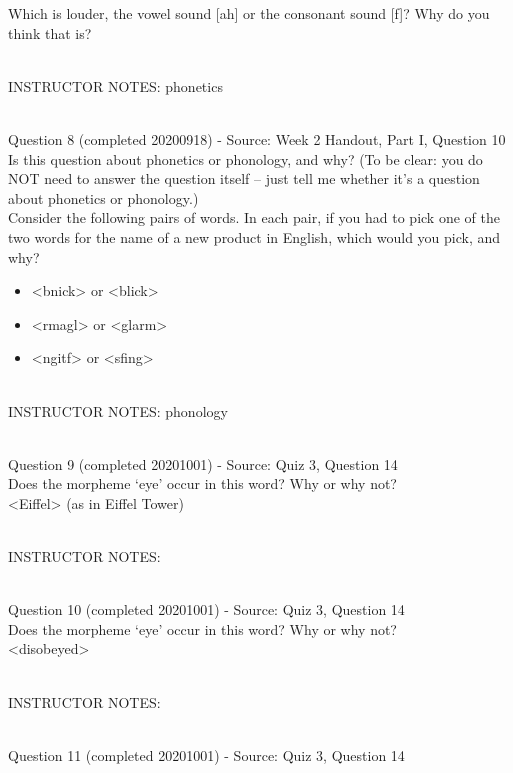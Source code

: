 \documentclass[12pt]{article}
\begin{document}
Which is louder, the vowel sound {[ah]} or the consonant sound {[f]}? Why do you think that is?


~\\
INSTRUCTOR NOTES: phonetics


~\\

{\large Question 8} (completed 20200918) - Source: Week 2 Handout, Part I, Question 10\\

Is this question about phonetics or phonology, and why? (To be clear: you do NOT need to answer the question itself -- just tell me whether it's a question about phonetics or phonology.)\\

Consider the following pairs of words. In each pair, if you had to pick one of the two words for the name of a new product in English, which would you pick, and why? \begin{itemize} \item <bnick> or <blick> \item <rmagl> or <glarm> \item <ngitf> or <sfing> \end{itemize}


~\\
INSTRUCTOR NOTES: phonology


~\\

{\large Question 9} (completed 20201001) - Source: Quiz 3, Question 14\\

Does the morpheme ‘eye’ occur in this word? Why or why not?\\

<Eiffel> (as in Eiffel Tower)


~\\
INSTRUCTOR NOTES: 


~\\

{\large Question 10} (completed 20201001) - Source: Quiz 3, Question 14\\

Does the morpheme ‘eye’ occur in this word? Why or why not?\\

<disobeyed>


~\\
INSTRUCTOR NOTES: 


~\\

{\large Question 11} (completed 20201001) - Source: Quiz 3, Question 14\\
\end{document}
